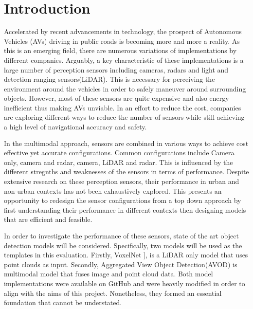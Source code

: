 %
%
\let\textcircled=\pgftextcircled
\chapter{Introduction}
\label{chap:intro}

Accelerated by recent advancements in technology, the prospect of Autonomous Vehicles (AVs) driving in public roads is becoming more and more a reality. As this is an emerging field, there are numerous variations of implementations by different companies. Arguably, a key characteristic of these implementations is a large number of perception sensors including cameras, radars and light and detection ranging sensors(LiDAR). This is necessary for perceiving the environment around the vehicles in order to safely maneuver around surrounding objects. However, most of these sensors are quite expensive and also energy inefficient thus making AVs unviable. In an effort to reduce the cost, companies are exploring different ways to reduce the number of sensors while still achieving a high level of navigational accuracy and safety.
 
In the multimodal approach, sensors are combined in various ways to achieve  cost effective yet accurate configurations. Common configurations include Camera only, camera and radar, camera, LiDAR and radar. This is influenced by the different stregnths and weaknesses of the sensors in terms of performance.  
Despite extensive research on these perception sensors, their performance  in urban and non-urban contexts has not been exhaustively explored. This presents an opportunity to redesign the sensor configurations from a top down approach by first understanding their performance in different contexts then designing models that are efficient and feasible.

In order to investigate the performance of these sensors, state of the art object detection models will be considered. Specifically, two models will be used as the templates in this evaluation. Firstly, VoxelNet \cite{zhou2017voxelnet}], is a LiDAR only  model that uses point clouds as input. Secondly, Aggregated View Object Detection(AVOD) \cite{ku2017joint} is multimodal model that fuses image and point cloud data. Both model implementations were available on GitHub and were heavily modified in order to align with the aims of this project. Nonetheless, they formed an essential foundation that cannot be understated. 

